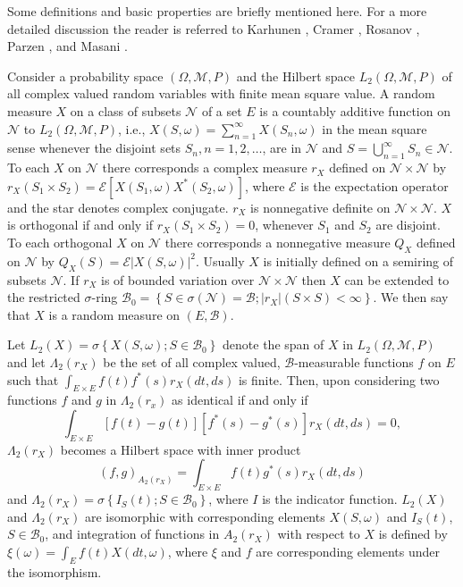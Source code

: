\documentclass{article}
\begin{document}
Some definitions and basic properties are briefly mentioned here. For a more detailed discussion the reader is referred to Karhunen \cite{karhunen1947}, Cramer \cite{cramer1951}, Rosanov \cite{rosanov1959}, Parzen \cite{parzen1967}, and Masani \cite{masani1968}.

Consider a probability space $(\Omega, \mathscr{M}, P)$ and the Hilbert space $L_{2}(\Omega, \mathscr{M}, P)$ of all complex valued random variables with finite mean square value. A random measure $X$ on a class of subsets $\mathscr{N}$ of a set $E$ is a countably additive function on $\mathscr{N}$ to $L_{2}(\Omega, \mathscr{M}, P)$, i.e., $X(S, \omega)=\sum_{n=1}^{\infty} X\left(S_{n}, \omega\right)$ in the mean square sense whenever the disjoint sets $S_{n}, n=1,2, \ldots$, are in $\mathscr{N}$ and $S=\bigcup_{n=1}^{\infty} S_{n} \in \mathscr{N}$. To each $X$ on $\mathscr{N}$ there corresponds a complex measure $r_{X}$ defined on $\mathscr{N} \times \mathscr{N}$ by $r_{X}\left(S_{1} \times S_{2}\right)=\mathscr{E}\left[X\left(S_{1}, \omega\right) X^{*}\left(S_{2}, \omega\right)\right]$, where $\mathscr{E}$ is the expectation operator and the star denotes complex conjugate. $r_{X}$ is nonnegative definite on $\mathscr{N} \times \mathscr{N}$. $X$ is orthogonal if and only if $r_{X}\left(S_{1} \times S_{2}\right)=0$, whenever $S_{1}$ and $S_{2}$ are disjoint. To each orthogonal $X$ on $\mathscr{N}$ there corresponds a nonnegative measure $Q_{X}$ defined on $\mathscr{N}$ by $Q_{X}(S)=\mathscr{E}|X(S, \omega)|^{2}$. Usually $X$ is initially defined on a semiring of subsets $\mathscr{N}$. If $r_{X}$ is of bounded variation over $\mathscr{N} \times \mathscr{N}$ then $X$ can be extended to the restricted $\sigma$-ring $\mathscr{B}_{0}=\left\{S \in \sigma(\mathscr{N})=\mathscr{B} ;\left|r_{X}\right|(S \times S)<\infty\right\}$. We then say that $X$ is a random measure on $(E, \mathscr{B})$.

Let $L_{2}(X)=\sigma\left\{X(S, \omega) ; S \in \mathscr{B}_{0}\right\}$ denote the span of $X$ in $L_{2}(\Omega, \mathscr{M}, P)$ and let $\Lambda_{2}\left(r_{X}\right)$ be the set of all complex valued, $\mathscr{B}$-measurable functions $f$ on $E$ such that $\int_{E \times E} f(t) f^{*}(s) r_{X}(d t, d s)$ is finite. Then, upon considering two functions $f$ and $g$ in $\Lambda_{2}\left(r_{x}\right)$ as identical if and only if
\[
\int_{E \times E}[f(t)-g(t)]\left[f^{*}(s)-g^{*}(s)\right] r_{X}(d t, d s)=0,
\]
$\Lambda_{2}\left(r_{X}\right)$ becomes a Hilbert space with inner product
\[
(f, g)_{A_{2}\left(r_{X}\right)}=\int_{E \times E} f(t) g^{*}(s) r_{X}(d t, d s)
\]
and $\Lambda_{2}\left(r_{X}\right)=\sigma\left\{I_{S}(t) ; S \in \mathscr{B}_{0}\right\}$, where $I$ is the indicator function. $L_{2}(X)$ and $\Lambda_{2}\left(r_{X}\right)$ are isomorphic with corresponding elements $X(S, \omega)$ and $I_{S}(t)$, $S \in \mathscr{B}_{0}$, and integration of functions in $A_{2}\left(r_{X}\right)$ with respect to $X$ is defined by $\xi(\omega)=\int_{E} f(t) X(d t, \omega)$, where $\xi$ and $f$ are corresponding elements under the isomorphism.
\end{document}
